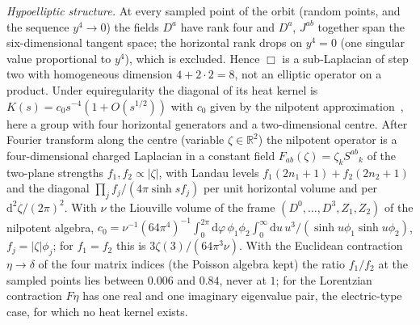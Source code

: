 \emph{Hypoelliptic structure.} At every sampled point of the orbit (random points, and the sequence \(y^4\to0\)) the fields \(D^a\) have rank four and \(D^a\), \(J^{ab}\) together span the six-dimensional tangent space; the horizontal rank drops on \(y^4=0\) (one singular value proportional to \(y^4\)), which is excluded. Hence \(\Box\) is a sub-Laplacian of step two with homogeneous dimension \(4+2\cdot2=8\), not an elliptic operator on a product. Under equiregularity the diagonal of its heat kernel is \(K(s)=c_0s^{-4}(1+O(s^{1/2}))\) with \(c_0\) given by the nilpotent approximation~\cite{BenArous1989}, here a group with four horizontal generators and a two-dimensional centre. After Fourier transform along the centre (variable \(\zeta\in\mathbb R^2\)) the nilpotent operator is a four-dimensional charged Laplacian in a constant field \(F_{ab}(\zeta)=\zeta_kS^{ab}{}_k\) of the two-plane strengths \(f_1,f_2\propto|\zeta|\), with Landau levels \(f_1(2n_1+1)+f_2(2n_2+1)\) and the diagonal \(\prod_j f_j/(4\pi\sinh sf_j)\) per unit horizontal volume and per \(\mathrm d^2\zeta/(2\pi)^2\). With \(\nu\) the Liouville volume of the frame \((D^0,\dots,D^3,Z_1,Z_2)\) of the nilpotent algebra, \(c_0=\nu^{-1}(64\pi^4)^{-1}\!\int_0^{2\pi}\!\mathrm d\varphi\,\phi_1\phi_2\!\int_0^\infty\!\mathrm du\,u^3/(\sinh u\phi_1\sinh u\phi_2)\), \(f_j=|\zeta|\phi_j\); for \(f_1=f_2\) this is \(3\zeta(3)/(64\pi^3\nu)\). With the Euclidean contraction \(\eta\to\delta\) of the four matrix indices (the Poisson algebra kept) the ratio \(f_1/f_2\) at the sampled points lies between \(0.006\) and \(0.84\), never at \(1\); for the Lorentzian contraction \(F\eta\) has one real and one imaginary eigenvalue pair, the electric-type case, for which no heat kernel exists.

